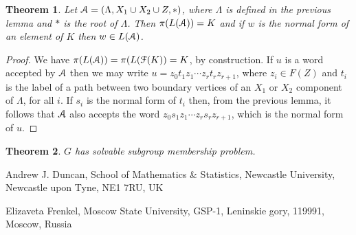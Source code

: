 \documentclass[a4paper,12pt]{article}
\renewcommand{\L}{\Lambda }
\newcommand{\cA}{{\cal{A}}}
\newcommand{\cF}{{\cal{F}}}
\newtheorem{theorem}{Theorem}[section]
\numberwithin{equation}{section}
\numberwithin{figure}{section}
\renewcommand{\cF}{\mathcal{F}}
\begin{document}
\begin{theorem}
Let $\cA=(\L,X_1\cup X_2\cup Z,\ast)$, where $\L$ is defined in the previous
lemma and $\ast$ is the root of $\L$. Then $\pi(L(\cA))=K$ and if $w$ is the normal form of an element
of $K$ then $w\in L(\cA)$.
\end{theorem}
\begin{proof}
We have $\pi(L(\cA))=\pi(L(\cF(K))=K$, by construction. If $u$ is a word
accepted by $\cA$ then we may write $u=z_0t_1z_1\cdots z_rt_rz_{r+1}$, where
$z_i\in F(Z)$ and $t_i$ is the label of a path between two boundary
vertices of an $X_1$ or $X_2$ component of $\L$, for all $i$. If
$s_i$ is the normal form of $t_i$ then, from the previous lemma, it follows
that $\cA$ also accepts the word $z_0s_1z_1\cdots z_rs_rz_{r+1}$, which
is the normal form of $u$.
\end{proof}
\begin{theorem}
$G$ has solvable subgroup membership problem.
\end{theorem}



\medskip



\noindent \textsf{Andrew J. Duncan, School of Mathematics \&
Statistics, Newcastle University, Newcastle upon Tyne, NE1 7RU,
UK}



\noindent \textsf{Elizaveta Frenkel, Moscow State University,
GSP-1, Leninskie gory, 119991, Moscow, Russia}

\end{document}
